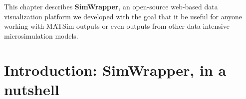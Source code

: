 \documentclass[3p,times,procedia]{elsarticle}
\begin{document}
This chapter describes \textbf{SimWrapper}, an open-source web-based
data visualization platform we developed with the goal that it be useful
for anyone working with MATSim outputs or even outputs from other
data-intensive microsimulation models.






\section{Introduction: SimWrapper, in a nutshell}

\subsection{}
\end{document}
